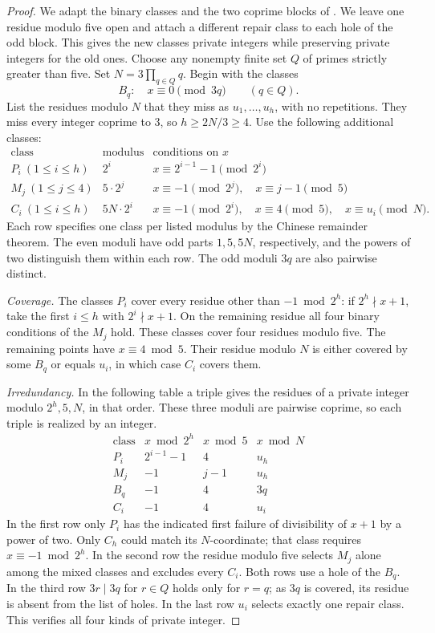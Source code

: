 \documentclass[11pt]{article}
\begin{document}
\begin{proof}
We adapt the binary classes and the two coprime blocks of
\cite[p.~1]{maj}. We leave one residue modulo five open and attach a
different repair class to each hole of the odd block. This gives the new
classes private integers while preserving private integers for the old ones.
Choose any nonempty finite set \(Q\) of primes strictly greater than five.
Set \(N=3\prod_{q\in Q}q\). Begin with the classes
\[
 B_q:\quad x\equiv0\pmod{3q}\qquad(q\in Q).
\]
List the residues modulo \(N\) that they miss as \(u_1,\ldots,u_h\), with no
repetitions. They miss every integer coprime to 3, so \(h\ge 2N/3\ge4\).
Use the following additional classes:
\[
\begin{array}{lll}
\text{class} &\text{modulus}&\text{conditions on }x\\ \hline
P_i\ (1\le i\le h)&2^i&x\equiv 2^{i-1}-1\pmod {2^i}\\
M_j\ (1\le j\le4)&5\cdot2^j&x\equiv-1\pmod{2^j},\quad x\equiv j-1\pmod5\\
C_i\ (1\le i\le h)&5N\cdot2^i&x\equiv-1\pmod{2^i},\quad
                  x\equiv4\pmod5,\quad x\equiv u_i\pmod N .
\end{array}
\]
Each row specifies one class per listed modulus by the Chinese remainder
theorem. The even moduli have odd parts \(1,5,5N\), respectively, and the
powers of two distinguish them within each row. The odd moduli \(3q\) are
also pairwise distinct.

\emph{Coverage.} The classes \(P_i\) cover every residue other than
\(-1\bmod 2^h\): if \(2^h\nmid x+1\), take the first \(i\le h\) with
\(2^i\nmid x+1\). On the remaining residue all four binary conditions of
the \(M_j\) hold. These classes cover four residues modulo five.
The remaining points have \(x\equiv4\bmod5\). Their residue modulo \(N\)
is either covered by some \(B_q\) or equals \(u_i\), in which case \(C_i\)
covers them.

\emph{Irredundancy.} In the following table a triple gives the residues of a
private integer modulo \(2^h,5,N\), in that order. These three moduli are
pairwise coprime, so each triple is realized by an integer.
\[
\begin{array}{c|ccc}
\text{class}&x\bmod 2^h&x\bmod5&x\bmod N\\\hline
P_i&2^{i-1}-1&4&u_h\\
M_j&-1&j-1&u_h\\
B_q&-1&4&3q\\
C_i&-1&4&u_i
\end{array}
\]
In the first row only \(P_i\) has the indicated first failure of divisibility
of \(x+1\) by a power of two. Only \(C_h\) could match its \(N\)-coordinate;
that class requires \(x\equiv-1\bmod 2^h\). In the second row the residue
modulo five selects \(M_j\) alone among the mixed classes and excludes
every \(C_i\). Both rows use a hole of the \(B_q\).
In the third row \(3r\mid 3q\) for \(r\in Q\) holds only for \(r=q\);
as \(3q\) is covered, its residue is absent from the list of holes.
In the last row \(u_i\) selects exactly one repair class. This verifies
all four kinds of private integer.


\end{proof}
\end{document}
